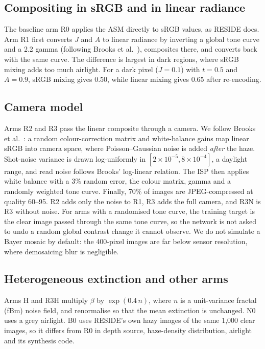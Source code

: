 \documentclass{article}
\begin{document}
\subsection{Compositing in sRGB and in linear radiance}
The baseline arm R0 applies the ASM directly to sRGB values, as RESIDE does. Arm R1 first converts $J$ and $A$ to linear radiance by inverting a global tone curve and a 2.2 gamma (following Brooks et al.~\cite{brooks2019unprocessing}), composites there, and converts back with the same curve. The difference is largest in dark regions, where sRGB mixing adds too much airlight. For a dark pixel ($J=0.1$) with $t=0.5$ and $A=0.9$, sRGB mixing gives 0.50, while linear mixing gives 0.65 after re-encoding.

\subsection{Camera model}
Arms R2 and R3 pass the linear composite through a camera. We follow Brooks et al.~\cite{brooks2019unprocessing}: a random colour-correction matrix and white-balance gains map linear sRGB into camera space, where Poisson--Gaussian noise is added \emph{after} the haze. Shot-noise variance is drawn log-uniformly in $[2\times10^{-5}, 8\times10^{-4}]$, a daylight range, and read noise follows Brooks' log-linear relation. The ISP then applies white balance with a 3\% random error, the colour matrix, gamma and a randomly weighted tone curve. Finally, 70\% of images are JPEG-compressed at quality 60--95. R2 adds only the noise to R1, R3 adds the full camera, and R3N is R3 without noise. For arms with a randomised tone curve, the training target is the clear image passed through the same tone curve, so the network is not asked to undo a random global contrast change it cannot observe. We do not simulate a Bayer mosaic by default: the 400-pixel images are far below sensor resolution, where demosaicing blur is negligible.

\subsection{Heterogeneous extinction and other arms}
Arms H and R3H multiply $\beta$ by $\exp(0.4\,n)$, where $n$ is a unit-variance fractal (fBm) noise field, and renormalise so that the mean extinction is unchanged. N0 uses a grey airlight. B0 uses RESIDE's own hazy images of the same 1{,}000 clear images, so it differs from R0 in depth source, haze-density distribution, airlight and its synthesis code.
\end{document}

